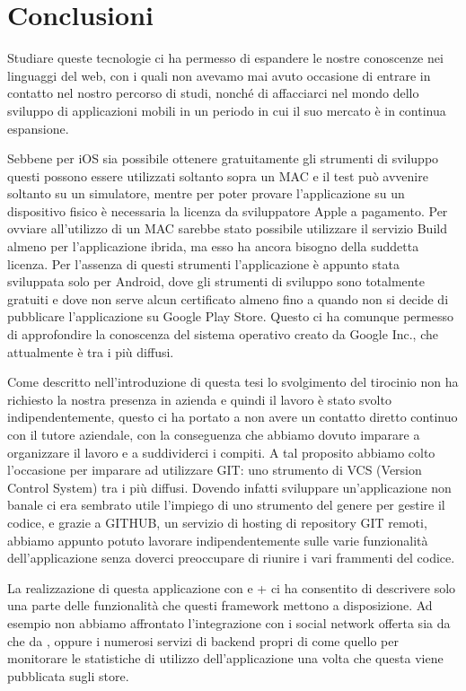 \chapter{Conclusioni}
    Studiare queste tecnologie ci ha permesso di espandere le nostre
    conoscenze nei linguaggi del web, con i quali non avevamo mai avuto
    occasione di entrare in contatto nel nostro percorso di studi, nonché di
    affacciarci nel mondo dello sviluppo di applicazioni mobili in un periodo in
    cui il suo mercato è in continua espansione.

    Sebbene per iOS
    sia possibile ottenere gratuitamente gli strumenti di sviluppo questi
    possono essere utilizzati soltanto sopra un MAC e il test può avvenire
    soltanto su un simulatore, mentre per poter provare l'applicazione su un
    dispositivo fisico è necessaria la licenza da sviluppatore Apple a
    pagamento. Per ovviare all'utilizzo di un MAC sarebbe stato
    possibile utilizzare il servizio \pg{} Build almeno per l'applicazione
    ibrida, ma
    esso ha ancora bisogno della suddetta licenza. Per l'assenza di questi
    strumenti l'applicazione è appunto stata sviluppata solo per Android, dove
    gli strumenti di sviluppo sono totalmente gratuiti e dove non serve alcun
    certificato almeno fino a quando non si decide di pubblicare
    l'applicazione su Google Play Store.
    Questo ci ha comunque permesso di approfondire la
    conoscenza del sistema operativo creato da Google Inc., che attualmente è
    tra i più diffusi.

    Come descritto nell'introduzione di questa tesi lo svolgimento del
    tirocinio non ha richiesto la nostra presenza in azienda e quindi il
    lavoro è stato svolto indipendentemente, questo ci ha portato a non avere
    un contatto diretto continuo con il tutore aziendale, con la conseguenza
    che abbiamo dovuto imparare a organizzare il lavoro e a suddividerci i
    compiti. A tal proposito abbiamo colto l'occasione per imparare ad
    utilizzare GIT: uno strumento di VCS (Version Control System) tra i più
    diffusi. Dovendo infatti sviluppare un'applicazione non banale ci era
    sembrato utile l'impiego di uno strumento del genere per gestire il codice,
    e grazie a GITHUB, un servizio di hosting  di repository GIT remoti, abbiamo
    appunto potuto lavorare indipendentemente sulle varie funzionalità
    dell'applicazione senza doverci preoccupare di riunire i vari frammenti
    del codice.

    La realizzazione di questa applicazione con \tisdk{} e \pg{}+\kendomob{}
    ci ha consentito di descrivere solo una parte delle funzionalità che
    questi frame\-work mettono a disposizione. Ad esempio non abbiamo affrontato
    l'integrazione con i social network offerta sia da \tisdk{} che da \pg{},
    oppure i numerosi servizi di backend propri di \tisdk{} come quello per
    monitorare le statistiche di utilizzo dell'applicazione una volta che
    questa viene pubblicata sugli store.

